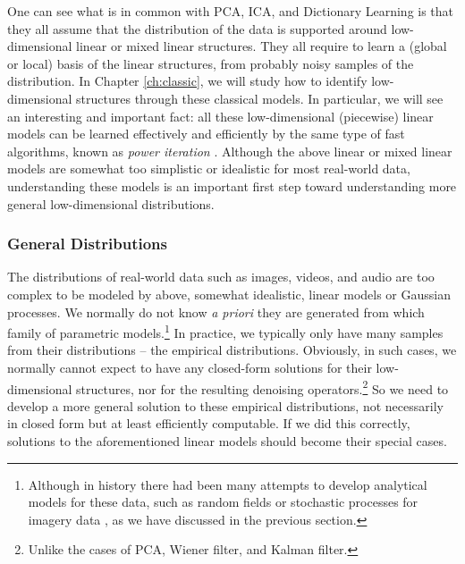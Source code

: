 \documentclass[../../book-main.tex]{subfiles}
\begin{document}
One can see what is in common with PCA, ICA, and Dictionary Learning is that they all assume that the distribution of the data is supported around low-dimensional linear or mixed linear structures. They all require to learn a (global or local) basis of the linear structures, from probably noisy samples of the distribution. In Chapter \ref{ch:classic}, we will study how to identify low-dimensional structures through these classical models. In particular, we will see an interesting and important fact: all these low-dimensional (piecewise) linear models can be learned effectively and efficiently by the same type of fast algorithms, known as {\em power iteration} \cite{Zhai-2020}. Although the above linear or mixed linear models are somewhat too simplistic or idealistic for most real-world data, understanding these models is an important first step toward understanding more general low-dimensional distributions. 

\subsubsection{General Distributions}\label{sec:denoising-intro}

The distributions of real-world data such as images, videos, and audio are too complex to be modeled by above, somewhat idealistic, linear models or Gaussian processes. We normally do not know {\em a priori} they are generated from which family of parametric models.\footnote{Although in history there had been many attempts to develop analytical models for these data, such as random fields or stochastic processes for imagery data \cite{Mumford-1999}, as we have discussed in the previous section.} In practice, we typically only have many samples from their distributions -- the empirical distributions. Obviously, in such cases, we normally cannot expect to have any closed-form solutions for their low-dimensional structures, nor for the resulting denoising operators.\footnote{Unlike the cases of PCA, Wiener filter, and Kalman filter.} So we need to develop a more general solution to these empirical distributions, not necessarily in closed form but at least efficiently computable. If we did this correctly, solutions to the aforementioned linear models should become their special cases. 
\end{document}

